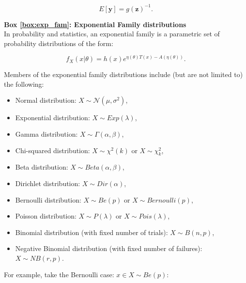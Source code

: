 \begin{equation*}
 E[\mathbf{y}] = g(\mathbf{z})^{-1}. 
\end{equation*}




\newpage

\begin{Comment}
\hspace{-2.5mm}\textbf{Box \ref{box:exp_fam}: Exponential Family distributions}\label{box:exp_fam}\\
In probability and statistics, an exponential family \cite{andersen1970sufficiency} is a parametric set of probability distributions of the form:

\begin{equation*}
    f_X(x|\theta) = h(x)e^{\eta(\theta) T(x)-A(\eta(\theta))}.
\end{equation*}

Members of the exponential family distributions include (but are not limited to) the following:
\begin{itemize}
    \item Normal distribution: $X \sim \mathcal{N}(\mu,\sigma^2)$,
    \item Exponential distribution: $ X \sim Exp(\lambda)$,
    \item Gamma distribution: $ X \sim \Gamma(\alpha,\beta)$,
    \item Chi-squared distribution: $ X \sim \chi^2 (k)$ or $ X \sim \chi_k^2$,
    \item Beta distribution: $ X \sim Beta(\alpha,\beta)$,
    \item Dirichlet distribution: $ X \sim Dir(\alpha)$,
    \item Bernoulli distribution: $ X \sim Be(p)$ or $ X \sim Bernoulli(p)$,
    \item Poisson distribution: $ X \sim P(\lambda)$ or $ X \sim Pois(\lambda)$,
    \item Binomial distribution (with fixed number of trials): $ X \sim B(n,p)$,
    \item Negative Binomial distribution (with fixed number of failures): $ X \sim NB(r,p)$.\\
\end{itemize}

For example, take the Bernoulli case: $x \in X \sim Be(p)$:


\end{Comment}

